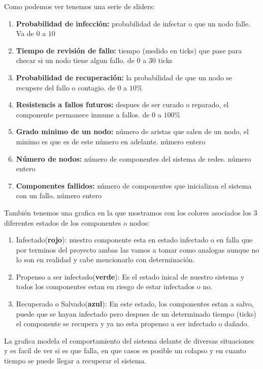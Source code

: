 \documentclass[12pt]{article}
\begin{document}
Como podemos ver tenemos una serie de sliders:\\
\begin{enumerate}
    \item \textbf{Probabilidad de infección:} probabilidad de infectar o que un nodo falle. Va de $0$ a $10$
    \item \textbf{Tiempo de revisión de fallo:} tiempo (medido en ticks) que pase para checar si un nodo tiene algun fallo. de $0$ a $30$ ticks
    \item \textbf{Probabilidad de recuperación:} la probabilidad de que un nodo se recupere del fallo o contagio. de $0$ a $10$\%
    \item \textbf{Resistencis a fallos futuros:} despues de ser curado o reparado, el componente permanece inmune a fallos. de $0$ a $100$\%
    \item \textbf{Grado minimo de un nodo:} número de aristas que salen de un nodo, el minimo es que es de este número en adelante. número entero
    \item \textbf{Número de nodos:} número de componentes del sistema de redes. número entero
    \item \textbf{Componentes fallidos:} número de componentes que inicializan el sistema con un fallo. número entero
\end{enumerate}

También tenemos una grafica en la que mostramos con los colores asociados los 3 diferentes estados de los componentes o nodos:\\

\begin{enumerate}
    \item Infectado(\textbf{rojo}): nuestro componente esta en estado infectado o en falla que por terminos del proyecto ambas las vamos a tomar como analogas aunque no lo son en realidad y cabe mencionarlo con determinación.
    \item Propenso a ser infectado(\textbf{verde}): Es el estado inical de nuestro sistema y todos los componentes estan en riesgo de estar infectados o no.
    \item Recuperado o Salvado(\textbf{azul}): En este estado, los componentes estan a salvo, puede que se hayan infectado pero despues de un determinado tiempo (ticks) el componente se recupera y ya no esta propenso a ser infectado o dañado. 
\end{enumerate}

La grafica modela el comportamiento del sistema delante de diversas situaciones y es facil de ver si es que falla, en que casos es posible un colapso y en cuanto tiempo se puede llegar a recuperar el sistema.\\
\end{document}
